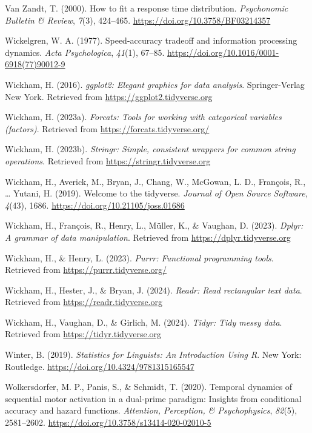 \documentclass[
  english,
  man, donotrepeattitle,floatsintext]{apa6}
\newlength{\cslhangindent}
\newenvironment{CSLReferences}[2] %
 {\begin{list}{}{%
  \setlength{\itemindent}{0pt}
  \setlength{\leftmargin}{0pt}
  \setlength{\parsep}{0pt}
  \ifodd #1
   \setlength{\leftmargin}{\cslhangindent}
   \setlength{\itemindent}{-1\cslhangindent}
  \fi
  \setlength{\itemsep}{#2\baselineskip}}}
 {\end{list}}
\begin{document}
\begin{CSLReferences}{1}{0}
Van Zandt, T. (2000). How to fit a response time distribution. \emph{Psychonomic Bulletin \& Review}, \emph{7}(3), 424--465. \url{https://doi.org/10.3758/BF03214357}

Wickelgren, W. A. (1977). Speed-accuracy tradeoff and information processing dynamics. \emph{Acta Psychologica}, \emph{41}(1), 67--85. \url{https://doi.org/10.1016/0001-6918(77)90012-9}

Wickham, H. (2016). \emph{ggplot2: Elegant graphics for data analysis}. Springer-Verlag New York. Retrieved from \url{https://ggplot2.tidyverse.org}

Wickham, H. (2023a). \emph{Forcats: Tools for working with categorical variables (factors)}. Retrieved from \url{https://forcats.tidyverse.org/}

Wickham, H. (2023b). \emph{Stringr: Simple, consistent wrappers for common string operations}. Retrieved from \url{https://stringr.tidyverse.org}

Wickham, H., Averick, M., Bryan, J., Chang, W., McGowan, L. D., François, R., \ldots{} Yutani, H. (2019). Welcome to the {tidyverse}. \emph{Journal of Open Source Software}, \emph{4}(43), 1686. \url{https://doi.org/10.21105/joss.01686}

Wickham, H., François, R., Henry, L., Müller, K., \& Vaughan, D. (2023). \emph{Dplyr: A grammar of data manipulation}. Retrieved from \url{https://dplyr.tidyverse.org}

Wickham, H., \& Henry, L. (2023). \emph{Purrr: Functional programming tools}. Retrieved from \url{https://purrr.tidyverse.org/}

Wickham, H., Hester, J., \& Bryan, J. (2024). \emph{Readr: Read rectangular text data}. Retrieved from \url{https://readr.tidyverse.org}

Wickham, H., Vaughan, D., \& Girlich, M. (2024). \emph{Tidyr: Tidy messy data}. Retrieved from \url{https://tidyr.tidyverse.org}

Winter, B. (2019). \emph{Statistics for {Linguists}: {An Introduction Using R}}. New York: Routledge. \url{https://doi.org/10.4324/9781315165547}

Wolkersdorfer, M. P., Panis, S., \& Schmidt, T. (2020). Temporal dynamics of sequential motor activation in a dual-prime paradigm: {Insights} from conditional accuracy and hazard functions. \emph{Attention, Perception, \& Psychophysics}, \emph{82}(5), 2581--2602. \url{https://doi.org/10.3758/s13414-020-02010-5}

\end{CSLReferences}
\end{document}

